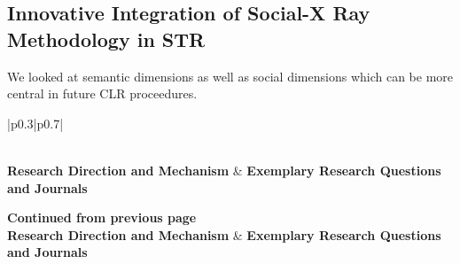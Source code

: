 \documentclass[12pt]{article}
\begin{document}
\subsection{Innovative Integration of Social-X Ray Methodology in STR}
We looked at semantic dimensions as well as social dimensions which can be more central in future CLR proceedures.
\onecolumn 
\begin{longtable}{|p{}|p{}|}
\caption{Overview of Research Priorities and Guidelines.}
\label{tab:my-table_rpg_3j}\\
\hline
\textbf{Research Direction and Mechanism} & \textbf{Exemplary Research Questions and Journals} \\
\hline
\endfirsthead

%
{{\bfseries Continued from previous page}} \\
\hline
\textbf{Research Direction and Mechanism} & \textbf{Exemplary Research Questions and Journals} \\
\hline
\endhead

\hline {} \\ \hline
\endfoot


\end{longtable}
\end{document}
